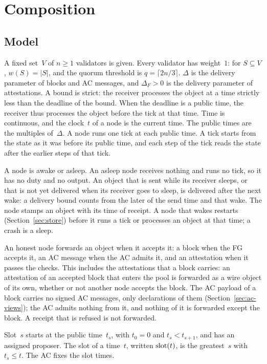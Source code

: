 \section{Composition}\label{sec:composition}

\subsection{Model}\label{sec:model}

A fixed set~$V$ of $n\geq1$ validators is given.  Every validator has
weight~$1$: for $S\subseteq V$, $w(S)=|S|$, and the quorum threshold is
$q=\lceil 2n/3\rceil$.  $\Delta$ is the delivery parameter of blocks and
AC messages, and $\Delta_F>0$ is the delivery parameter of
attestations.  A bound is strict: the receiver processes the object at
a time strictly less than the deadline of the bound.  When the deadline is
a public time, the receiver thus processes the object before the tick at
that time.  Time is continuous, and the clock~$t$ of a node is the
current time.  The public times are the multiples of~$\Delta$.  A node
runs one tick at each public time.  A tick starts from the state as it
was before its public time, and each step of the tick reads the state
after the earlier steps of that tick.

A node is awake or asleep.  An asleep node receives nothing and runs no
tick, so it has no duty and no output.  An object that is sent while its
receiver sleeps, or that is not yet delivered when its receiver goes to
sleep, is delivered after the next wake: a delivery bound counts from the
later of the send time and that wake.  The node stamps an object with its
time of receipt.  A node that wakes restarts (Section~\ref{sec:store})
before it runs a tick or processes an object at that time; a crash is a
sleep.

An honest node forwards an object when it accepts it: a block when the FG accepts it, an
AC message when the AC admits it, and an attestation when it passes the
checks.  This includes the attestations that a block carries: an
attestation of an accepted block that enters the pool is forwarded as a
wire object of its own, whether or not another node accepts the block.
The AC payload of a block carries no signed AC messages, only
declarations of them (Section~\ref{sec:ac-views}); the AC admits nothing
from it, and nothing of it is forwarded except the block.  A receipt that is refused is not
forwarded.

Slot~$s$ starts at the public time~$t_s$, with $t_0=0$ and
$t_s<t_{s+1}$, and has an assigned proposer.  The slot of a time~$t$, written $\operatorname{slot}(t)$, is
the greatest~$s$ with $t_s\leq t$.  The AC fixes the slot times.

